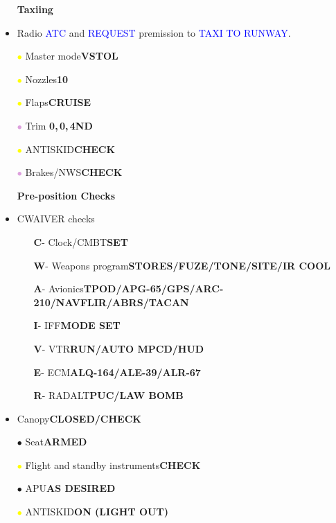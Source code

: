 \documentclass[a4paper,12pt,dvipsnames]{letter}
\newcommand{\radio}[1]{\textcolor{blue}{#1}}
\newcommand{\button}[1]{\textbf{#1}}
\newcommand{\Deg}{\textdegree{}}
\newcommand{\bi}{\textcolor{ProcessBlue}{$\bullet$\;}}
\newcommand{\yi}{\textcolor{Yellow}{$\bullet$\;}}
\newcommand{\vi}{\textcolor{Plum}{$\bullet$\;}}
\begin{document}
{\begin{itemize}
\end{itemize}
\newpage
\begin{itemize}
\item[] {\LARGE\textbf{Taxiing}}
\item Radio \radio{ATC} and \radio{REQUEST} premission to \radio{TAXI TO RUNWAY}.
\item[\yi] Master mode\dotfill\button{VSTOL}
\item[\yi] Nozzles\dotfill\button{10\Deg}
\item[\yi] Flaps\dotfill\button{CRUISE}
\item[\vi] Trim \dotfill\button{0\Deg,\,0\Deg,\,4\Deg\;ND}
\item[\yi] ANTISKID\dotfill\button{CHECK}
\item[\vi] Brakes/NWS\dotfill\button{CHECK}
\end{itemize}
\vspace{1em}
\begin{itemize}
\item[] {\LARGE\textbf{Pre-position Checks}}
\item CWAIVER checks
\begin{itemize}
\item[\textbf{C}-] Clock/CMBT\dotfill\button{SET}
\item[\textbf{W}-] Weapons program\dotfill\button{STORES/FUZE/TONE/SITE/IR COOL}
\item[\textbf{A}-] Avionics\dotfill\button{TPOD/APG-65/GPS/ARC-210/NAVFLIR/ABRS/TACAN}
\item[\textbf{I}-] IFF\dotfill\button{MODE SET}
\item[\textbf{V}-] VTR\dotfill\button{RUN/AUTO MPCD/HUD}
\item[\textbf{E}-] ECM\dotfill\button{ALQ-164/ALE-39/ALR-67}
\item[\textbf{R}-] RADALT\dotfill\button{PUC/LAW BOMB}
\end{itemize}
\item Canopy\dotfill\button{CLOSED/CHECK}
\item[\bi] Seat\dotfill\button{ARMED}
\item[\yi] Flight and standby instruments\dotfill\button{CHECK}
\item[\bi] APU\dotfill\button{AS DESIRED}
\item[\yi] ANTISKID\dotfill\button{ON (LIGHT OUT)}

\end{itemize}}
\end{document}

